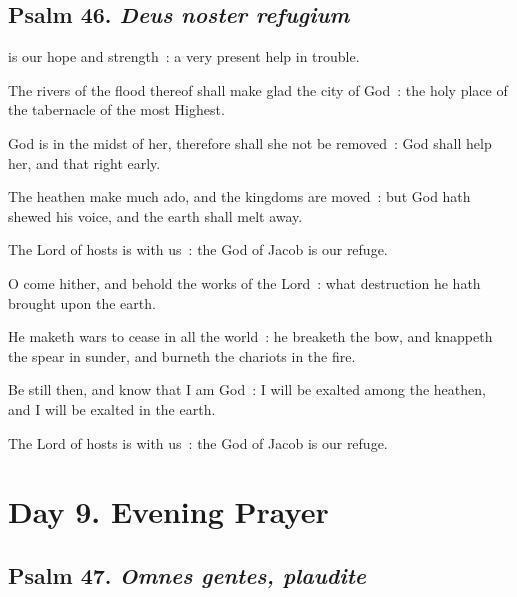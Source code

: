 \subsection{Psalm 46. \textit{Deus noster refugium}}


 is our hope and strength~: a very present help in trouble.\par
{}
The rivers of the flood thereof shall make glad the city of God~: the holy place of the tabernacle of the most Highest.\par
{}God is in the midst of her, therefore shall she not be removed~: God shall help her, and that right early.\par
{}The heathen make much ado, and the kingdoms are moved~: but God hath shewed his voice, and the earth shall melt away.\par
{}The Lord of hosts is with us~: the God of Jacob is our refuge.\par
{}O come hither, and behold the works of the Lord~: what destruction he hath brought upon the earth.\par
{}He maketh wars to cease in all the world~: he breaketh the bow, and knappeth the spear in sunder, and burneth the chariots in the fire.\par
{}Be still then, and know that I am God~: I will be exalted among the heathen, and I will be exalted in the earth.\par
{}The Lord of hosts is with us~: the God of Jacob is our refuge.\par

\section*{Day 9. Evening Prayer}

\subsection{Psalm 47. \textit{Omnes gentes, plaudite}}

